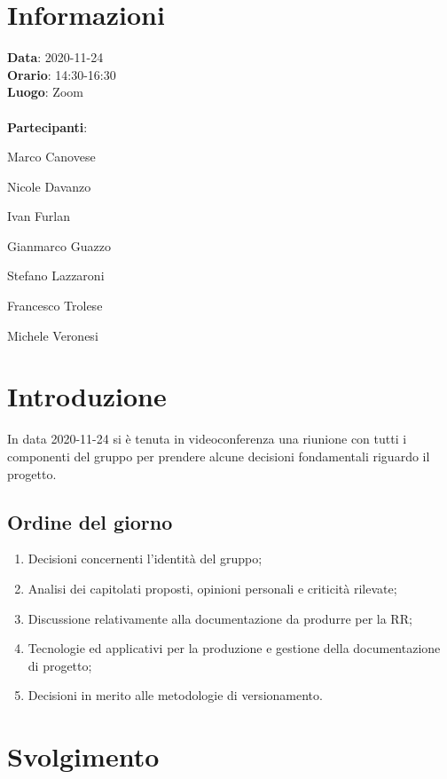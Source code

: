 \section{Informazioni}
\textbf{Data}: 2020-11-24\\
\textbf{Orario}: 14:30-16:30\\
\textbf{Luogo}: Zoom\\\\
\textbf{Partecipanti}:\begin{list}{*}{\setlength{\itemsep}{0cm}}
	\item Marco Canovese
	\item Nicole Davanzo
	\item Ivan Furlan
	\item Gianmarco Guazzo
	\item Stefano Lazzaroni
	\item Francesco Trolese
	\item Michele Veronesi
\end{list}

\section{Introduzione}
In data 2020-11-24 si è tenuta in videoconferenza una riunione con tutti i componenti del gruppo per prendere alcune decisioni fondamentali riguardo il progetto.

\subsection{Ordine del giorno}
\begin{enumerate}
    \item Decisioni concernenti l'identità del gruppo;
    \item Analisi dei capitolati proposti, opinioni personali e criticità rilevate;
    \item Discussione relativamente alla documentazione da produrre per la RR;
    \item Tecnologie ed applicativi per la produzione e gestione della documentazione di progetto;
    \item Decisioni in merito alle metodologie di versionamento.
\end{enumerate}

\section{Svolgimento}

